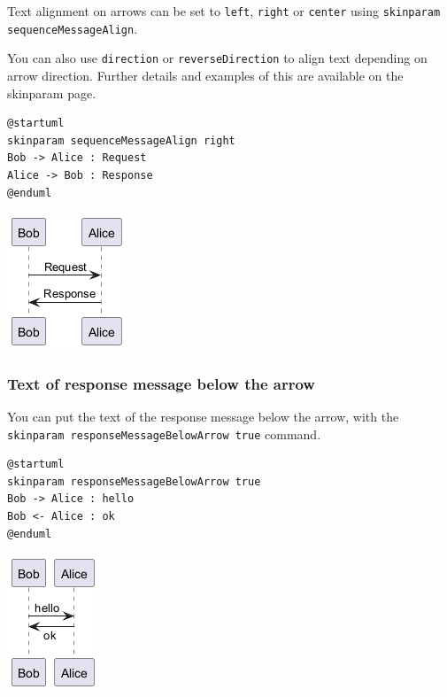 Text alignment on arrows can be set to \texttt{left}, \texttt{right} or \texttt{center} using \texttt{skinparam sequenceMessageAlign}. 


You can also use \texttt{direction} or \texttt{reverseDirection} to align text depending on arrow direction. Further details and examples of this are available on the skinparam page.


\begin{verbatim}
@startuml
skinparam sequenceMessageAlign right
Bob -> Alice : Request
Alice -> Bob : Response
@enduml
\end{verbatim}
\begin{center}
\includegraphics[scale=0.60]{imgw/img-2bcb9c2980c5243ee4aefe834849bbf5.png}
\end{center}


\subsubsection{Text of response message below the arrow}


You can put the text of the response message below the arrow, with the \texttt{skinparam responseMessageBelowArrow true} command.


\begin{verbatim}
@startuml
skinparam responseMessageBelowArrow true
Bob -> Alice : hello
Bob <- Alice : ok
@enduml
\end{verbatim}
\begin{center}
\includegraphics[scale=0.60]{imgw/img-47439438c617287f7b5c1619b3c72ae2.png}
\end{center}
%
%
